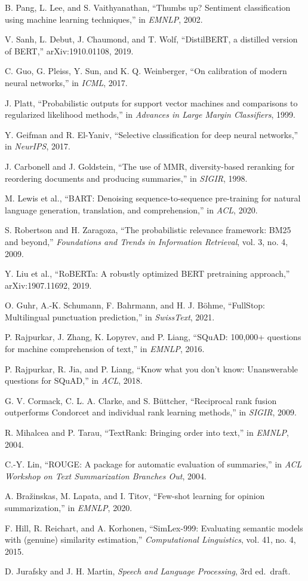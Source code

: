 \documentclass[11pt,a4paper]{article}
\begin{document}
\begin{enumerate}[label={[\arabic*]},leftmargin=*,itemsep=1pt]
\item B. Pang, L. Lee, and S. Vaithyanathan, ``Thumbs up? Sentiment classification using machine learning techniques,'' in \textit{EMNLP}, 2002.
\item V. Sanh, L. Debut, J. Chaumond, and T. Wolf, ``DistilBERT, a distilled version of BERT,'' arXiv:1910.01108, 2019.
\item C. Guo, G. Pleiss, Y. Sun, and K. Q. Weinberger, ``On calibration of modern neural networks,'' in \textit{ICML}, 2017.
\item J. Platt, ``Probabilistic outputs for support vector machines and comparisons to regularized likelihood methods,'' in \textit{Advances in Large Margin Classifiers}, 1999.
\item Y. Geifman and R. El-Yaniv, ``Selective classification for deep neural networks,'' in \textit{NeurIPS}, 2017.
\item J. Carbonell and J. Goldstein, ``The use of MMR, diversity-based reranking for reordering documents and producing summaries,'' in \textit{SIGIR}, 1998.
\item M. Lewis et al., ``BART: Denoising sequence-to-sequence pre-training for natural language generation, translation, and comprehension,'' in \textit{ACL}, 2020.
\item S. Robertson and H. Zaragoza, ``The probabilistic relevance framework: BM25 and beyond,'' \textit{Foundations and Trends in Information Retrieval}, vol. 3, no. 4, 2009.
\item Y. Liu et al., ``RoBERTa: A robustly optimized BERT pretraining approach,'' arXiv:1907.11692, 2019.
\item O. Guhr, A.-K. Schumann, F. Bahrmann, and H. J. B\"{o}hme, ``FullStop: Multilingual punctuation prediction,'' in \textit{SwissText}, 2021.
\item P. Rajpurkar, J. Zhang, K. Lopyrev, and P. Liang, ``SQuAD: 100,000+ questions for machine comprehension of text,'' in \textit{EMNLP}, 2016.
\item P. Rajpurkar, R. Jia, and P. Liang, ``Know what you don't know: Unanswerable questions for SQuAD,'' in \textit{ACL}, 2018.
\item G. V. Cormack, C. L. A. Clarke, and S. B\"{u}ttcher, ``Reciprocal rank fusion outperforms Condorcet and individual rank learning methods,'' in \textit{SIGIR}, 2009.
\item R. Mihalcea and P. Tarau, ``TextRank: Bringing order into text,'' in \textit{EMNLP}, 2004.
\item C.-Y. Lin, ``ROUGE: A package for automatic evaluation of summaries,'' in \textit{ACL Workshop on Text Summarization Branches Out}, 2004.
\item A. Bra\v{z}inskas, M. Lapata, and I. Titov, ``Few-shot learning for opinion summarization,'' in \textit{EMNLP}, 2020.
\item F. Hill, R. Reichart, and A. Korhonen, ``SimLex-999: Evaluating semantic models with (genuine) similarity estimation,'' \textit{Computational Linguistics}, vol. 41, no. 4, 2015.
\item D. Jurafsky and J. H. Martin, \textit{Speech and Language Processing}, 3rd ed.\ draft.
\end{enumerate}
\end{document}

